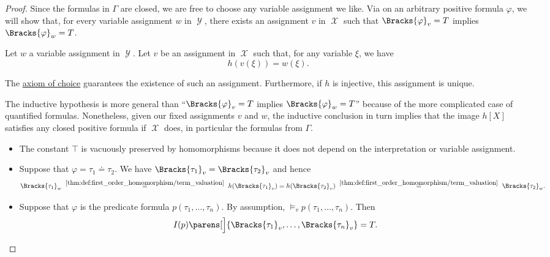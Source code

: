 \begin{proof}
  Since the formulas in \( \Gamma \) are closed, we are free to choose any variable assignment we like. Via  on an arbitrary positive formula \( \varphi \), we will show that, for every variable assignment \( w \) in \( \mscrY \), there exists an assignment \( v \) in \( \mscrX \) such that \( \Bracks{\varphi}_v = T \) implies \( \Bracks{\varphi}_w = T \).

  Let \( w \) a variable assignment in \( \mscrY \). Let \( v \) be an assignment in \( \mscrX \) such that, for any variable \( \xi \), we have
  \begin{equation*}
    h(v(\xi)) = w(\xi).
  \end{equation*}

  The \hyperref[def:zfc/choice]{axiom of choice} guarantees the existence of such an assignment. Furthermore, if \( h \) is injective, this assignment is unique.

  The inductive hypothesis is more general than \enquote{\( \Bracks{\varphi}_v = T \) implies \( \Bracks{\varphi}_w = T \)} because of the more complicated case of quantified formulas. Nonetheless, given our fixed assignments \( v \) and \( w \), the inductive conclusion in turn implies that the image \( h[X] \) satisfies any closed positive formula if \( \mscrX \) does, in particular the formulas from \( \Gamma \).

  \begin{itemize}
    \item The constant \( \top \) is vacuously preserved by homomorphisms because it does not depend on the interpretation or variable assignment.

    \item Suppose that \( \varphi = \tau_1 \doteq \tau_2 \). We have \( \Bracks{\tau_1}_v = \Bracks{\tau_2}_v \) and hence
    \begin{equation*}
      \Bracks{\tau_1}_w
      \reloset {\ref{thm:def:first_order_homomorphism/term_valuation}} =
      h(\Bracks{\tau_1}_v)
      =
      h(\Bracks{\tau_2}_v)
      \reloset {\ref{thm:def:first_order_homomorphism/term_valuation}} =
      \Bracks{\tau_2}_w.
    \end{equation*}

    \item Suppose that \( \varphi \) is the predicate formula \( p(\tau_1, \ldots, \tau_n) \). By assumption, \( \vDash_v p(\tau_1, \ldots, \tau_n) \). Then
    \begin{equation}\label{eq:thm:positive_formulas_preserved_under_homomorphism/predicates/x}
      I(p) \parens[\Big]{ \Bracks{\tau_1}_v, \ldots, \Bracks{\tau_n}_v } = T.
    \end{equation}


\end{itemize}
\end{proof}
